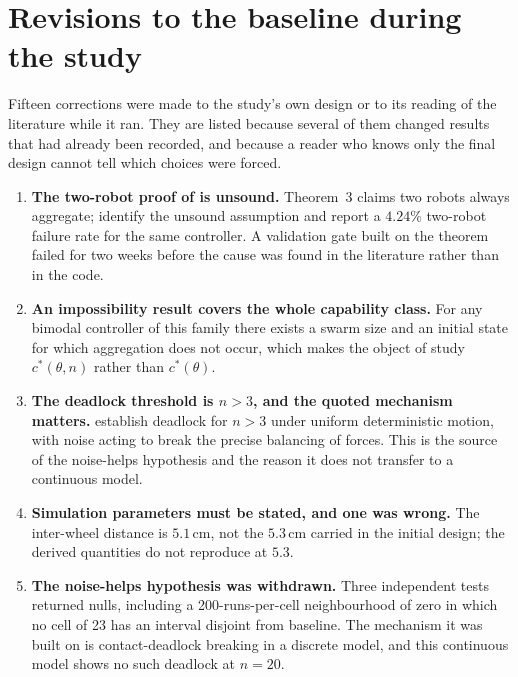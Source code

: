 \documentclass[11pt,a4paper]{article}
\begin{document}
\clearpage

\section{Revisions to the baseline during the study}
\label{app:corrections}

Fifteen corrections were made to the study's own design or to its reading of the
literature while it ran. They are listed because several of them changed results
that had already been recorded, and because a reader who knows only the final
design cannot tell which choices were forced.

\begin{enumerate}
\item \textbf{The two-robot proof of \citet{gauci2014} is unsound.} Theorem~3
claims two robots always aggregate; \citet{steinberg2025} identify the
unsound assumption and report a $4.24\%$ two-robot failure rate for the same
controller. A validation gate built on the theorem failed for two weeks before
the cause was found in the literature rather than in the code.

\item \textbf{An impossibility result covers the whole capability class.} For any
bimodal controller of this family there exists a swarm size and an initial state
for which aggregation does not occur, which makes the object of study
$c^*(\theta, n)$ rather than $c^*(\theta)$.

\item \textbf{The deadlock threshold is $n > 3$, and the quoted mechanism
matters.} \citet{daymude2021} establish deadlock for $n > 3$ under uniform
deterministic motion, with noise acting to break the precise balancing of
forces. This is the source of the noise-helps hypothesis and the reason it does
not transfer to a continuous model.

\item \textbf{Simulation parameters must be stated, and one was wrong.} The
inter-wheel distance is $5.1$\,cm, not the $5.3$\,cm carried in the initial
design; the derived quantities do not reproduce at $5.3$.

\item \textbf{The noise-helps hypothesis was withdrawn.} Three independent tests
returned nulls, including a 200-runs-per-cell neighbourhood of zero in which no
cell of 23 has an interval disjoint from baseline. The mechanism it was built on
is contact-deadlock breaking in a discrete model, and this continuous model
shows no such deadlock at $n = 20$.


\end{enumerate}
\end{document}
